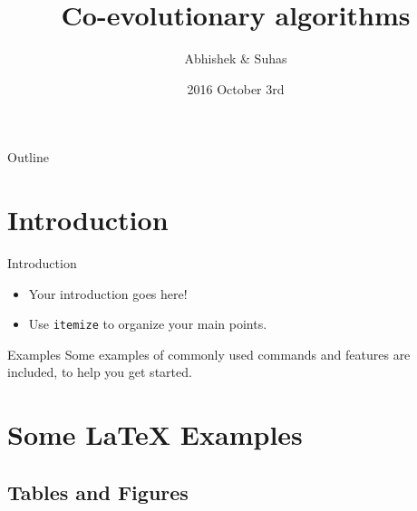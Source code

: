 \documentclass{beamer}
\title[CoEvAlgos!]{Co-evolutionary algorithms}
\author{Abhishek \& Suhas}
\institute{Purdue University}
\date{2016 October 3rd}
\begin{document}
\begin{frame}
  \titlepage
\end{frame}

\begin{frame}{Outline}
  \tableofcontents
\end{frame}

\section{Introduction}

\begin{frame}{Introduction}

\begin{itemize}
  \item Your introduction goes here!
  \item Use \texttt{itemize} to organize your main points.
\end{itemize}

\vskip 1cm

\begin{block}{Examples}
Some examples of commonly used commands and features are included, to help you get started.
\end{block}

\end{frame}

\section{Some \LaTeX{} Examples}

\subsection{Tables and Figures}
\end{document}
